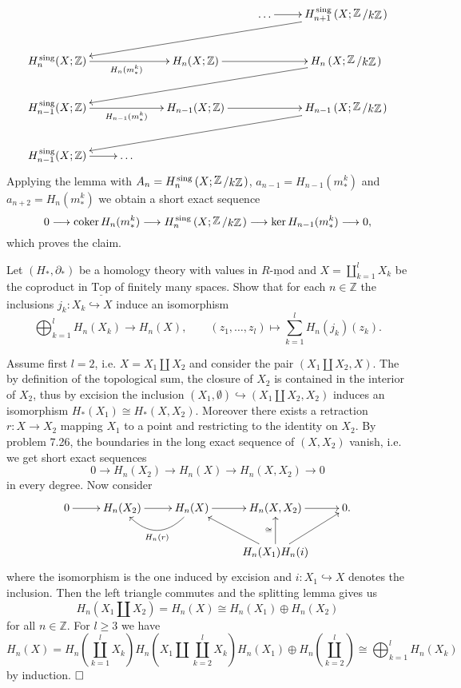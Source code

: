 \documentclass[11pt]{book}
\numberwithin{dummy}{section}
\theoremstyle{nonumberbreak}
\newenvironment{sol}[1][]{\ifthenelse{\equal{#1}{}}{\solution}{\solution[#1]}\rm}{\endsolution}
\newenvironment{prob}[1][]{\ifthenelse{\equal{#1}{}}{\problem}{\problem[#1]}\rm}{\endproblem}
\newcommand{\Rmod}{\underline{R\textrm{-}\mathrm{mod}}}
\newcommand{\topsp}{\underline{\mathrm{Top}}}
\newcommand{\cokern}{\mathrm{coker}\hspace{1.5pt}}
\newcommand{\la}{\longrightarrow}
\newcommand{\Z}{\mathbb{Z}}
\newcommand{\Hs}{H^{\hspace{1pt}\mathrm{sing}}}
\newcommand{\slant}[2]{{\raisebox{.1em}{$#1$}\left/\raisebox{-.1em}{$#2$}\right.}}
\begin{document}
\begin{spacing}{1.4}
\begin{prob}
\begin{sol}
\begin{compactenum}
$$
\begin{xy}
\xymatrix{
&&& \ldots \ar[r] & \Hs_{n+1}\left( X; \slant{\Z}{k\Z}\right) \ar[lllld] \\
\Hs_{n}(X;\Z) \ar[rr]_{H_n(m^k_*)} && H_n(X;\Z) \ar[rr] && H_n\left(X;\slant{\Z}{k\Z}\right) \ar[lllld] \\
\Hs_{n-1}(X;\Z) \ar[rr]_{H_{n-1}(m^k_*)} && H_{n-1}(X;\Z) \ar[rr] && H_{n-1}\left(X;\slant{\Z}{k\Z}\right) \ar[lllld] \\
\Hs_{n-1}(X;\Z) \ar[r] & \ldots &&&
}
\end{xy}
$$
Applying the lemma with $A_n = \Hs_n\left(X; \slant{\Z}{k\Z}\right)$, $a_{n-1}= H_{n-1}(m_*^k)$ and $a_{n+2} = H_n(m_*^k)$ we obtain a short exact sequence
$$0 \la \cokern H_n(m_*^k) \la \Hs_n\left(X; \slant{\Z}{k\Z}\right) \la \ker H_{n-1}(m_*^k) \la 0,$$
which proves the claim.



\end{compactenum}

\end{sol}

\end{prob}

\newpage
\begin{prob} %
Let $(H_*, \partial_*)$ be a homology theory with values in $\Rmod$ and $X=\coprod_{k=1}^l X_k$ be the coproduct in $\topsp$ of finitely many spaces. Show that for each $n \in \Z$ the inclusions $j_k: X_k \hookrightarrow X$ induce an isomorphism
$$\bigoplus_{k=1}^l H_n(X_k) \la H_n(X), \qquad (z_1, \ldots, z_l) \mapsto \sum_{k=1}^l H_n(j_k)(z_k).$$

\begin{sol}
Assume first $l=2$, i.e. $X= X_1 \amalg X_2$ and consider the pair $(X_1 \amalg X_2, X)$. The by definition of the topological sum, the closure of $X_2$ is contained in the interior of $X_2$, thus by excision the inclusion $(X_1, \emptyset) \hookrightarrow (X_1 \amalg X_2, X_2)$ induces an isomorphism $H_*(X_1) \cong H_*(X,X_2)$. Moreover there exists a retraction $r: X \la X_2$ mapping $X_1$ to a point and restricting to the identity on $X_2$. By problem 7.26, the boundaries in the long exact sequence of $(X,X_2)$ vanish, i.e. we get short exact sequences
$$0 \la H_n(X_2) \la H_n(X) \la H_n(X,X_2) \la 0$$
in every degree. Now consider
$$
\begin{xy}
\xymatrix{
0 \ar[r] & H_n(X_2) \ar[r]& H_n(X) \ar@/^{20pt}/[l]^{H_n(r)} \ar[r]& H_n(X,X_2) \ar[r] & 0. \\
&&&H_n(X_1) \ar[ru] \ar[lu]{H_n(i)} \ar[u]^{\cong} &
}
\end{xy}
$$
where the isomorphism is the one induced by excision and $i: X_1 \hookrightarrow X$ denotes the inclusion. Then the left triangle commutes and the splitting lemma gives us
$$H_n(X_1 \amalg X_2) = H_n(X) \cong H_n(X_1) \oplus H_n(X_2)$$
for all $n \in \Z$. For $l \geqslant 3$ we have 
$$H_n(X) = H_n\left( \coprod_{k=1}^l X_k\right) H_n\left( X_1 \amalg \coprod_{k=2}^l X_k \right) H_n(X_1) \oplus H_n\left( \coprod_{k=2}^l\right) \cong \bigoplus_{k=1}^l H_n(X_k)$$
by induction. $\hfill \Box$


\end{sol}
\end{prob}
\end{spacing}
\end{document}

